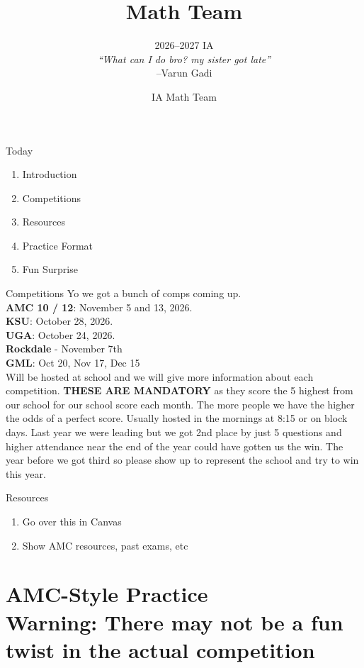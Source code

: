 \documentclass[aspectratio=169,xcolor=dvipsnames]{beamer}
\title[Math Team]{Math Team}
\subtitle{2026--2027 IA\\[0.8em]\textit{``What can I do bro? my sister got late''}\\[-0.2em]{\scriptsize --Varun Gadi}}
\author[IA Math Team]{IA Math Team}
\begin{document}
\begin{frame}[t]
  \titlepage
\end{frame}


\begin{frame}[t]{Today}
\vspace{0.35cm}
\begin{enumerate}
    \item Introduction
    \item Competitions
    \item Resources
    \item Practice Format
    \item Fun Surprise
\end{enumerate}
\end{frame}

\begin{frame}[t]{Competitions}
\vspace{0.35cm}
Yo we got a bunch of comps coming up. \\
\textbf{AMC 10 / 12}: November 5 and 13, 2026. \\
\textbf{KSU}: October 28, 2026. \\
\textbf{UGA}: October 24, 2026. \\
\textbf{Rockdale} - November 7th \\
\textbf{GML}: Oct 20, Nov 17, Dec 15\\
 \small{ Will be hosted at school and we will give more information about each competition. \textbf{THESE ARE MANDATORY} as they score the 5 highest from our school for our school score each month. The more people we have the higher the odds of a perfect score. Usually hosted in the mornings at 8:15 or on block days. Last year we were leading but we got 2nd place by just 5 questions and higher attendance near the end of the year could have gotten us the win. The year before we got third so please show up to represent the school and try to win this year.}

\end{frame}

\begin{frame}[t]{Resources}
\begin{enumerate}
    \item Go over this in Canvas
    \item Show AMC resources, past exams, etc
\end{enumerate}
\end{frame}

\section{AMC-Style Practice
\\
{\small Warning: There may not be a fun twist in the actual competition}}
\end{document}
